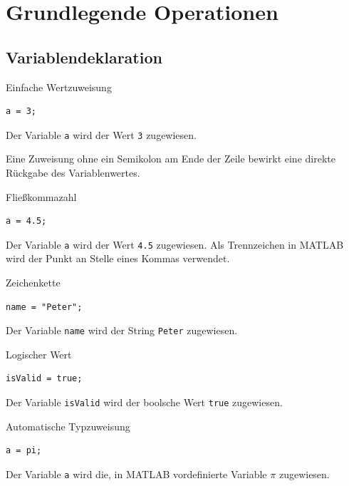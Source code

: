 \documentclass[12pt, a4paper, twoside]{article}
\begin{document}
    \section{Grundlegende Operationen}
        \subsection{Variablendeklaration}
                \begin{CodeErklaerungBox}{Einfache Wertzuweisung}
                \begin{lstlisting}
a = 3;
                \end{lstlisting}
                \tcblower
                Der Variable \texttt{a} wird der Wert \texttt{3} zugewiesen.
                \end{CodeErklaerungBox}
                \noindent Eine Zuweisung ohne ein Semikolon am Ende der Zeile bewirkt eine direkte Rückgabe des Variablenwertes.
                \begin{CodeErklaerungBox}{Fließkommazahl}
                \begin{lstlisting}
a = 4.5;
                \end{lstlisting}
                \tcblower
                Der Variable \texttt{a} wird der Wert \texttt{4.5} zugewiesen. Als Trennzeichen in MATLAB wird der Punkt an Stelle eines Kommas verwendet.
                \end{CodeErklaerungBox}
                \begin{CodeErklaerungBox}{Zeichenkette}
                \begin{lstlisting}
name = "Peter";
                \end{lstlisting}
                \tcblower
                Der Variable \texttt{name} wird der String \texttt{Peter} zugewiesen.
                \end{CodeErklaerungBox}
                \begin{CodeErklaerungBox}{Logischer Wert}
                \begin{lstlisting}
isValid = true;
                \end{lstlisting}
                \tcblower
                Der Variable \texttt{isValid} wird der boolsche Wert \texttt{true} zugewiesen.
                \end{CodeErklaerungBox}
                \begin{CodeErklaerungBox}{Automatische Typzuweisung}
                \begin{lstlisting}
a = pi;
                \end{lstlisting}
                \tcblower
                Der Variable \texttt{a} wird die, in MATLAB vordefinierte Variable $\pi$ zugewiesen.
                \end{CodeErklaerungBox}
\end{document}
